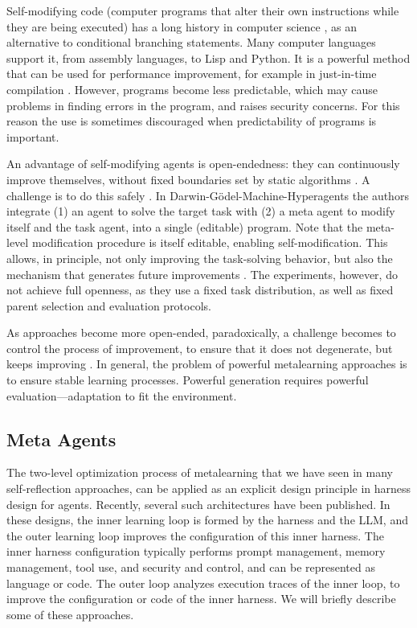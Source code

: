 Self-modifying code (computer programs that alter their own instructions while they are being executed) has a long history in computer science \citep{cai2007certified}, as an alternative to conditional branching statements. Many computer languages support it, from  assembly languages, to Lisp \citep{abelson2022structure} and Python. It is a powerful method that can be used for performance improvement, for example in just-in-time compilation \citep{ansel2011language}. However, programs become less predictable, which may cause problems in finding errors in the program, and raises security concerns. For this reason the use is sometimes discouraged when predictability of  programs is important.  

An advantage of self-modifying agents is open-endedness: they can  continuously improve themselves, without fixed boundaries set by static algorithms \citep{schmidhuber2007godel}. A challenge is to do this safely \citep{zhang2026darwingodelmachineopenended}.  
In Darwin-G\"odel-Machine-Hyperagents the authors  integrate (1) an agent to solve the target task with (2) a meta agent to  modify itself and the task agent, into a single (editable) program. Note that the meta-level modification procedure is itself editable, enabling self-modification. This allows, in principle, not only improving the task-solving behavior, but also the mechanism that generates future improvements \citep{zhang2026hyperagents}. The experiments, however, do not  achieve full openness, as they use a fixed task distribution, as well as fixed parent selection and evaluation protocols. 

As approaches become more open-ended, paradoxically, a challenge becomes to control the process of improvement, to ensure that it does not degenerate, but keeps improving \citep{cemri2025multi,ecoffet2020open}. 
In general, the problem of powerful metalearning approaches is to ensure stable learning processes. Powerful generation requires powerful evaluation---adaptation to fit the environment. %

\subsection{Meta Agents}
The two-level optimization process of metalearning that we have seen in many self-reflection approaches, can be applied as an explicit design principle in harness design for agents. Recently, several such architectures have been published. In these designs, the inner learning loop is formed by the harness and the LLM, and the outer learning loop improves the configuration of this inner harness. The inner harness configuration typically performs prompt management, memory management, tool use, and security and control, and can be represented as language or code. The outer loop analyzes execution traces of the inner loop, to improve the configuration or code of the inner harness. We will briefly describe some of these approaches.

